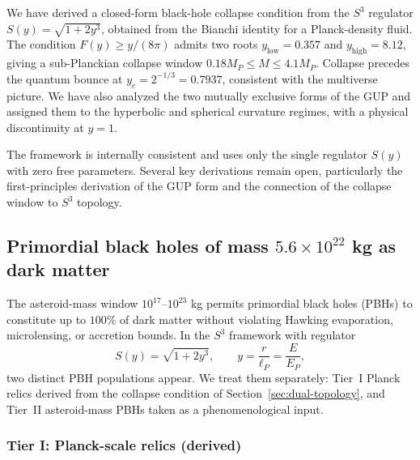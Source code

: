 \documentclass[a4paper,7pt,oneside,openany]{book}
\begin{document}
We have derived a closed-form black-hole collapse condition 
from the $S^{3}$ regulator $S(y)=\sqrt{1+2y^{3}}$, obtained 
from the Bianchi identity for a Planck-density fluid. The 
condition $F(y)\geq y/(8\pi)$ admits two roots 
$y_{\text{low}}=0.357$ and $y_{\text{high}}=8.12$, giving a 
sub-Planckian collapse window $0.18 M_{P}\leq M\leq 4.1 M_{P}$. 
Collapse precedes the quantum bounce at 
$y_{c}=2^{-1/3}=0.7937$, consistent with the multiverse picture. 
We have also analyzed the two mutually exclusive forms of the 
GUP and assigned them to the hyperbolic and spherical curvature 
regimes, with a physical discontinuity at $y=1$.

The framework is internally consistent and uses only the single 
regulator $S(y)$ with zero free parameters. Several key 
derivations remain open, particularly the first-principles 
derivation of the GUP form and the connection of the collapse 
window to $S^{3}$ topology.

\subsection{Primordial black holes of mass $5.6\times10^{22}$ kg 
as dark matter}
\label{sec:PBH-asteroid}

The asteroid-mass window $10^{17}$--$10^{23}$ kg permits 
primordial black holes (PBHs) to constitute up to $100\%$ of 
dark matter without violating Hawking evaporation, microlensing, 
or accretion bounds. In the $S^{3}$ framework with regulator
\begin{equation}
S(y)=\sqrt{1+2y^{3}},\qquad y=\frac{r}{\ell_{P}}=\frac{E}{E_{P}},
\label{eq:S-PBH}
\end{equation}
two distinct PBH populations appear. We treat them separately: 
Tier~I Planck relics derived from the collapse condition of 
Section~\ref{sec:dual-topology}, and Tier~II asteroid-mass PBHs 
taken as a phenomenological input.

\subsubsection{Tier I: Planck-scale relics (derived)}
\end{document}
